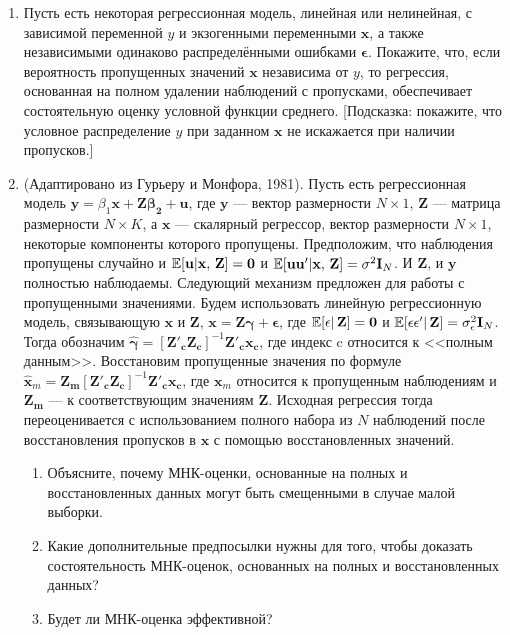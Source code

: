 \begin{enumerate}
\item Пусть есть некоторая регрессионная модель, линейная или нелинейная, с зависимой переменной $y$ и экзогенными переменными $\mathbf{x}$, а также независимыми одинаково распределёнными ошибками $\mathbf{\epsilon}$. Покажите, что, если вероятность пропущенных значений $\mathbf{x}$ независима от $y$, то регрессия, основанная на полном удалении наблюдений с пропусками, обеспечивает состоятельную оценку условной функции среднего. [Подсказка: покажите, что условное распределение $y$ при заданном $\mathbf{x}$ не искажается при наличии пропусков.]

\item (Адаптировано из Гурьеру и Монфора, 1981). Пусть есть регрессионная модель $\mathbf{y}=\beta_1\mathbf{x}+\mathbf{Z\beta_2} + \mathbf{u}$, где $\mathbf{y}$ --– вектор размерности $N \times 1$, $\mathbf{Z}$ --– матрица размерности $N \times K$, а $\mathbf{x}$ --– скалярный регрессор, вектор размерности $N \times 1$, некоторые компоненты которого пропущены. Предположим, что наблюдения пропущены случайно и $\mathbb{E}[\mathbf{u}|\mathbf{x, \, Z}]=\mathbf{0}$ и $\mathbb{E}[\mathbf{uu'}|\mathbf{x, \, Z}]=\sigma^2\mathbf{I}_N$. И $\mathbf{Z}$, и $\mathbf{y}$ полностью наблюдаемы. 
Следующий механизм предложен для работы с пропущенными значениями. Будем использовать линейную регрессионную модель, связывающую $\mathbf{x}$ и $\mathbf{Z}$, $\mathbf{x}=\mathbf{Z\gamma}+ \mathbf{\epsilon}$, где $\mathbb{E}[\mathbf{\epsilon}| \, \mathbf{Z}]=\mathbf{0}$ и $\mathbb{E}[\mathbf{\epsilon \epsilon'}| \, \mathbf{Z}]=\sigma^2_{\epsilon}\mathbf{I}_N$. Тогда обозначим $\widehat{\mathbf{\gamma}}=[\mathbf{Z'_c Z_c}]^{-1}\mathbf{Z'_c x_c}$, где индекс c относится к <<полным данным>>. Восстановим пропущенные значения по формуле $\widehat{\mathbf{x}}_m=\mathbf{Z_m}[\mathbf{Z'_c Z_c}]^{-1}\mathbf{Z'_c x_c}$, где $\mathbf{x}_m$ относится к пропущенным наблюдениям и $\mathbf{Z_m}$ –-- к соответствующим значениям $\mathbf{Z}$. Исходная регрессия тогда переоценивается с использованием полного набора из $N$ наблюдений после восстановления пропусков в $\mathbf{x}$ с помощью восстановленных значений.
\begin{enumerate}
\item	Объясните, почему МНК-оценки, основанные на полных и восстановленных данных могут быть смещенными в случае малой выборки.
\item	Какие дополнительные предпосылки нужны для того, чтобы доказать состоятельность МНК-оценок, основанных на полных и восстановленных данных?
\item	Будет ли МНК-оценка эффективной?
\end{enumerate}


\end{enumerate}
